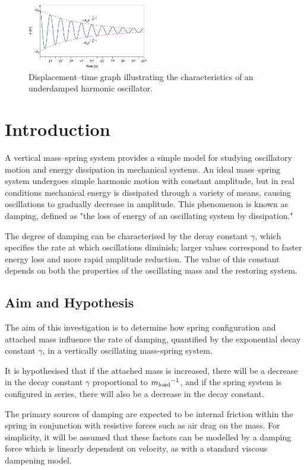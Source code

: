 \begin{figure}
    \centering
    \includegraphics[width=0.47\textwidth]{images/damped_shm.png}
    \caption{Displacement--time graph illustrating the characteristics of an underdamped harmonic oscillator.}
\end{figure}

\section{Introduction}

A vertical mass--spring system provides a simple model for studying oscillatory motion and energy dissipation in mechanical systems. An ideal mass--spring system undergoes simple harmonic motion with constant amplitude, but in real conditions mechanical energy is dissipated through a variety of means, causing oscillations to gradually decrease in amplitude. This phenomenon is known as damping, defined as "the loss of energy of an oscillating system by dissipation."

The degree of damping can be characterised by the decay constant $\gamma$, which specifies the rate at which oscillations diminish; larger values correspond to faster energy loss and more rapid amplitude reduction. The value of this constant depends on both the properties of the oscillating mass and the restoring system.

\subsection{Aim and Hypothesis}
The aim of this investigation is to determine how spring configuration and attached mass influence the rate of damping, quantified by the exponential decay constant $\gamma$, in a vertically oscillating mass-spring system.

It is hypothesised that if the attached mass is increased, there will be a decrease in the decay constant $\gamma$ proportional to $m{\textsubscript{load}}^{-1}$, and if the spring system is configured in series, there will also be a decrease in the decay constant.

The primary sources of damping are expected to be internal friction within the spring in conjunction with resistive forces such as air drag on the mass. For simplicity, it will be assumed that these factors can be modelled by a damping force which is linearly dependent on velocity, as with a standard viscous dampening model.

